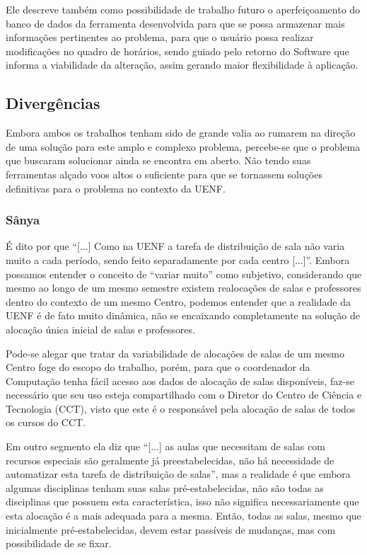Ele descreve também como possibilidade de trabalho futuro o aperfeiçoamento do banco de dados da ferramenta desenvolvida para que se possa armazenar mais informações pertinentes ao problema, para que o usuário possa realizar modificações no quadro de horários, sendo guiado pelo retorno do Software que informa a viabilidade da alteração, assim gerando maior flexibilidade à aplicação.

\subsection{Divergências} %

Embora ambos os trabalhos tenham sido de grande valia ao rumarem na direção de uma solução para este amplo e complexo problema, percebe-se que o problema que buscaram solucionar ainda se encontra em aberto. Não tendo suas ferramentas alçado voos altos o suficiente para que se tornassem soluções definitivas para o problema no contexto da UENF.

\subsubsection{Sânya} %

É dito por  que ``[...] Como na UENF a tarefa de distribuição de sala não varia muito a cada período, sendo feito separadamente por cada centro [...]''. Embora possamos entender o conceito de ``variar muito'' como subjetivo, considerando que mesmo ao longo de um mesmo semestre existem realocações de salas e professores dentro do contexto de um mesmo Centro, podemos entender que a realidade da UENF é de fato muito dinâmica, não se encaixando completamente na solução de alocação única inicial de salas e professores.

Pode-se alegar que tratar da variabilidade de alocações de salas de um mesmo Centro foge do escopo do trabalho, porém, para que o coordenador da Computação tenha fácil acesso aos dados de alocação de salas disponíveis, faz-se necessário que seu uso esteja compartilhado com o Diretor do Centro de Ciência e Tecnologia (CCT), visto que este é o responsável pela alocação de salas de todos os cursos do CCT.

Em outro segmento ela diz que ``[...] as aulas que necessitam de salas com recursos especiais são geralmente já preestabelecidas, não há necessidade de automatizar esta tarefa de distribuição de salas'', mas a realidade é que embora algumas disciplinas tenham suas salas pré-estabelecidas, não são todas as disciplinas que possuem esta característica, isso não significa necessariamente que esta alocação é a mais adequada para a mesma. Então, todas as salas, mesmo que inicialmente pré-estabelecidas, devem estar passíveis de mudanças, mas com possibilidade de se fixar.

